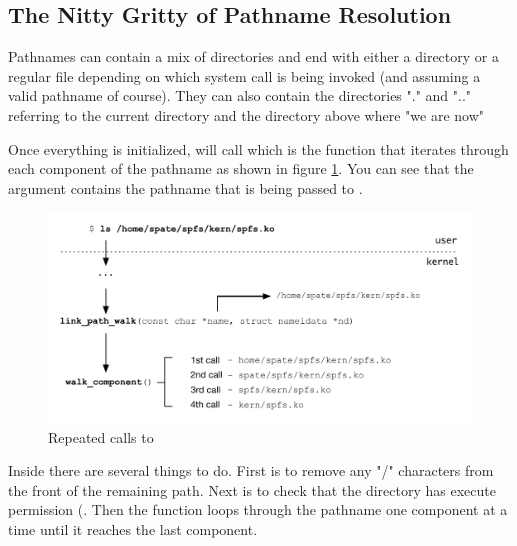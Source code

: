 

\subsection{The Nitty Gritty of Pathname Resolution}

Pathnames can contain a mix of directories and end with either a directory or a regular file depending on which system call is being invoked (and assuming a valid pathname of course). They can also contain the directories "." and ".." referring to the current directory and the directory above where "we are now"

Once everything is initialized,  will call  which is the function that iterates through each component of the pathname as shown in figure \ref{fig:link-path-walk}. You can see that the  argument contains the pathname that is being passed to .

\begin{figure}[h]
	\includegraphics[scale=0.6]{figures/link-path-walk.pdf}
	\centering
	\caption{Repeated calls to }
	\label{fig:link-path-walk}
\end{figure}

Inside  there are several things to do. First is to remove any "/" characters from the front of the remaining path. Next is to check that the directory has execute permission (. Then the function loops through the pathname one component at a time until it reaches the last component.

